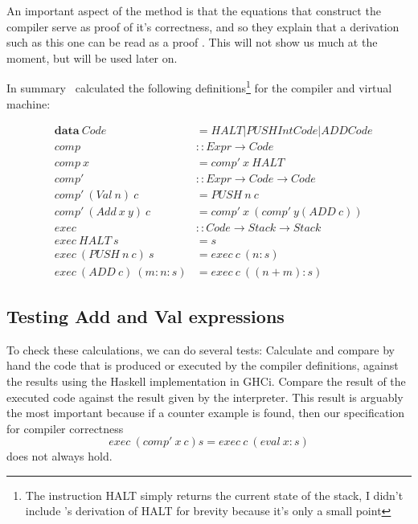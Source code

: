 \documentclass {article}
\begin{document}
An important aspect of the \BH method
is that the equations that construct the 
compiler serve as proof of it's correctness,
and so they explain that a derivation such as
this one can be read as a proof \cite[page 14]{bandh}.
This will not show us much at the moment,
but will be used later on.

In summary \BH\ calculated the following definitions\footnote{
The instruction HALT simply returns the current state of the stack,
I didn't include \BH's derivation of HALT for brevity because
it's only a small point}
for the compiler and virtual machine:

\begin{eqnarray}
	&\textbf{data} \ Code &= HALT | PUSH Int Code | ADD Code \nonumber \\
	&comp &:: Expr \rightarrow Code \nonumber \\
	&comp \ x &= comp' \ x \ HALT \label{comp}\\
	&comp' &:: Expr \rightarrow Code \rightarrow Code \nonumber \\
	&comp' \ (Val \ n) \ c &= PUSH \ n \ c \label{comppval}\\
	&comp' \ (Add \ x \ y) \ c 
				&= comp' \ x \ (comp' \ y (ADD \ c)) \label{comppadd}\\
	&exec &:: Code  \rightarrow Stack \rightarrow Stack \nonumber \\
	&exec \ HALT \ s &= s \label{exechalt}\\
	&exec \ (PUSH \ n \ c) \ s &= exec \ c \ (n:s) \label{execpush}\\
	&exec \ (ADD \ c) \ (m:n:s) &= exec \ c \ ((n + m):s) \label{execadd}
\end{eqnarray}

\subsection{Testing Add and Val expressions}

To check these calculations, we can do several tests:
Calculate and compare by hand 
the code that is produced or executed
by the compiler definitions, 
against the results using the Haskell implementation in GHCi.
Compare the result of the executed code against the result
given by the interpreter. This result is arguably the most
important because if a counter example is found,
then our specification for 
compiler correctness 
\[ exec\ (comp'\ x\ c) s = exec\ c\ (eval\ x : s) \]
does not always hold.

\end{document}
